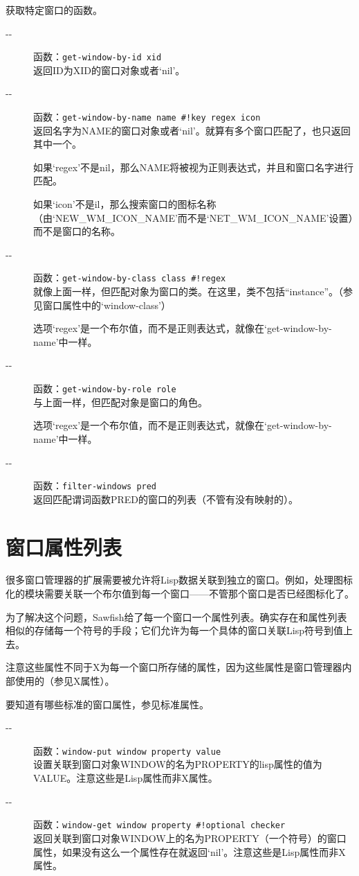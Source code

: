 \documentclass{book}
\begin{document}
\begin{CJK*}{UTF8}{gbsn}
获取特定窗口的函数。
\begin{description}
\item[-{}-] 函数：\verb|get-window-by-id xid|\\
返回ID为XID的窗口对象或者`nil'。
\item[-{}-] 函数：\verb|get-window-by-name name #!key regex icon|\\
返回名字为NAME的窗口对象或者`nil'。就算有多个窗口匹配了，也只返回其中一个。

如果`regex'不是nil，那么NAME将被视为正则表达式，并且和窗口名字进行匹配。

如果`icon'不是il，那么搜索窗口的图标名称（由`NEW\_WM\_ICON\_NAME'而不是`NET\_WM\_ICON\_NAME'设置）而不是窗口的名称。
\item[-{}-] 函数：\verb|get-window-by-class class #!regex|\\
就像上面一样，但匹配对象为窗口的类。在这里，类不包括``instance''。（参见窗口属性中的`window-class'）

选项`regex'是一个布尔值，而不是正则表达式，就像在`get-window-by-name'中一样。
\item[-{}-] 函数：\verb|get-window-by-role role|\\
与上面一样，但匹配对象是窗口的角色。

选项`regex'是一个布尔值，而不是正则表达式，就像在`get-window-by-name'中一样。
\item[-{}-] 函数：\verb|filter-windows pred|\\
返回匹配谓词函数PRED的窗口的列表（不管有没有映射的）。
\end{description}
\section{窗口属性列表}
很多窗口管理器的扩展需要被允许将Lisp数据关联到独立的窗口。例如，处理图标化的模块需要关联一个布尔值到每一个窗口------不管那个窗口是否已经图标化了。

为了解决这个问题，Sawfish给了每一个窗口一个属性列表。确实存在和属性列表相似的存储每一个符号的手段；它们允许为每一个具体的窗口关联Lisp符号到值上去。

注意这些属性不同于X为每一个窗口所存储的属性，因为这些属性是窗口管理器内部使用的（参见X属性）。

要知道有哪些标准的窗口属性，参见标准属性。
\begin{description}
\item[-{}-] 函数：\verb|window-put window property value|\\
设置关联到窗口对象WINDOW的名为PROPERTY的lisp属性的值为VALUE。注意这些是Lisp属性而非X属性。
\item[-{}-] 函数：\verb|window-get window property #!optional checker|\\
返回关联到窗口对象WINDOW上的名为PROPERTY（一个符号）的窗口属性，如果没有这么一个属性存在就返回`nil'。注意这些是Lisp属性而非X属性。


\end{description}
\end{CJK*}
\end{document}

